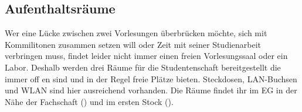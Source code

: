 \subsection{Aufenthaltsräume}
Wer eine Lücke zwischen zwei Vorlesungen 
überbrücken möchte, sich mit Kommilitonen 
zusammen setzen will oder Zeit mit seiner 
Studienarbeit verbringen muss, findet leider nicht 
immer einen freien Vorlesungssaal oder ein Labor. 
Deshalb werden drei Räume für die Studentenschaft bereitgestellt die 
immer off en sind und in der Regel freie Plätze bieten. Steckdosen, LAN-Buchsen und WLAN sind hier ausreichend vorhanden. Die Räume findet 
ihr im EG in der Nähe der Fachschaft () und im ersten 
Stock (). 